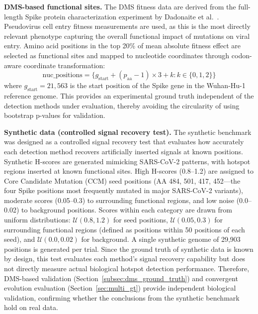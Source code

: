 \textbf{DMS-based functional sites.}\label{subsec:dms_ground_truth}
The DMS fitness data are derived from the full-length Spike protein characterization experiment by Dadonaite et al.~\cite{dadonaite2023dms, dadonaite2024nature}.
Pseudovirus cell entry fitness measurements are used, as this is the most directly relevant phenotype capturing the overall functional impact of mutations on viral entry.
Amino acid positions in the top 20\% of mean absolute fitness effect are selected as functional sites and mapped to nucleotide coordinates through codon-aware coordinate transformation:
\begin{equation}
\text{nuc\_positions} = \{g_{\text{start}} + (p_{\text{aa}} - 1) \times 3 + k : k \in \{0, 1, 2\}\}
\label{eq:coordinate_transform}
\end{equation}
where $g_{\text{start}} = 21{,}563$ is the start position of the Spike gene in the Wuhan-Hu-1 reference genome.
This provides an experimental ground truth independent of the detection methods under evaluation, thereby avoiding the circularity of using bootstrap p-values for validation.

\textbf{Synthetic data (controlled signal recovery test).}
The synthetic benchmark was designed as a controlled signal recovery test that evaluates how accurately each detection method recovers artificially inserted signals at known positions.
Synthetic H-scores are generated mimicking SARS-CoV-2 patterns, with hotspot regions inserted at known functional sites.
High H-scores (0.8--1.2) are assigned to Core Candidate Mutation (CCM) seed positions (AA 484, 501, 417, 452---the four Spike positions most frequently mutated in major SARS-CoV-2 variants), moderate scores (0.05--0.3) to surrounding functional regions, and low noise (0.0--0.02) to background positions.
Scores within each category are drawn from uniform distributions: $\mathcal{U}(0.8, 1.2)$ for seed positions, $\mathcal{U}(0.05, 0.3)$ for surrounding functional regions (defined as positions within 50 positions of each seed), and $\mathcal{U}(0.0, 0.02)$ for background. A single synthetic genome of 29,903 positions is generated per trial.
Since the ground truth of synthetic data is known by design, this test evaluates each method's signal recovery capability but does not directly measure actual biological hotspot detection performance.
Therefore, DMS-based validation (Section~\ref{subsec:dms_ground_truth}) and convergent evolution evaluation (Section~\ref{sec:multi_gt}) provide independent biological validation, confirming whether the conclusions from the synthetic benchmark hold on real data.

